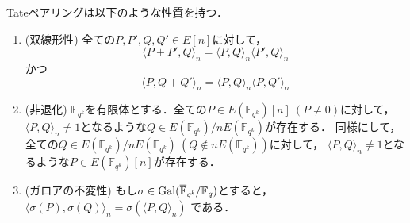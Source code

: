 Tateペアリングは以下のような性質を持つ．
\begin{enumerate}
  \item (双線形性) 全ての$P, P', Q, Q' \in E[n]$に対して，
  \[
  \langle P + P', Q \rangle _n = \langle P, Q \rangle _n \langle P', Q \rangle _n
  \]
  かつ
  \[
  \langle P, Q + Q' \rangle _n = \langle P, Q \rangle _n \langle P, Q' \rangle _n
  \]
  \item (非退化) $\mathbb{F}_{q^k}$を有限体とする．全ての$P \in E(\mathbb{F}_{q^k})[n] \ (P \not= 0)$に対して，
  $\langle P, Q\rangle _n \not= 1$となるような$Q \in E(\mathbb{F}_{q^k}) / nE(\mathbb{F}_{q^k})$が存在する．
  同様にして，全ての$Q \in E(\mathbb{F}_{q^k}) / nE(\mathbb{F}_{q^k}) \ (Q \notin nE(\mathbb{F}_{q^k}))$に対して，
  $\langle P, Q\rangle _n \not= 1$となるような$P \in E(\mathbb{F}_{q^k})[n]$が存在する．
  \item (ガロアの不変性) もし$\sigma \in \rm{Gal}\it{(\overline{\mathbb{F}}_{q^k} / \mathbb{F}_q)}$とすると，
  $\langle \sigma (P), \sigma (Q) \rangle _n = \sigma(\langle P, Q \rangle _n)$
  である．
\end{enumerate}

\par
